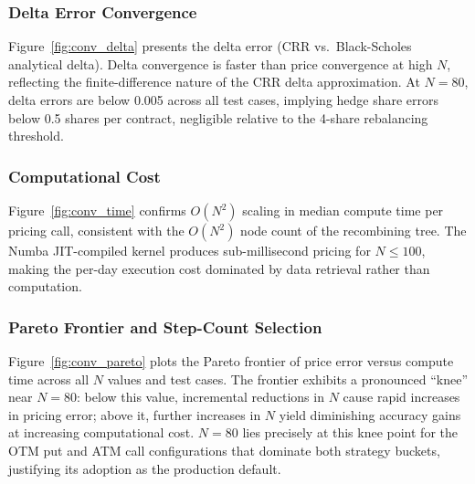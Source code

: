 \documentclass[10pt,twocolumn]{article}
\begin{document}
\subsubsection{Delta Error Convergence}

Figure~\ref{fig:conv_delta} presents the delta error (CRR vs.\ Black-Scholes
analytical delta). Delta convergence is faster than price convergence at high
$N$, reflecting the finite-difference nature of the CRR delta approximation.
At $N = 80$, delta errors are below 0.005 across all test cases, implying
hedge share errors below 0.5 shares per contract, negligible relative to
the 4-share rebalancing threshold.

\subsubsection{Computational Cost}

Figure~\ref{fig:conv_time} confirms $O(N^2)$ scaling in median compute time
per pricing call, consistent with the $O(N^2)$ node count of the recombining
tree. The Numba JIT-compiled kernel produces sub-millisecond pricing for
$N \leq 100$, making the per-day execution cost dominated by data retrieval
rather than computation.

\subsubsection{Pareto Frontier and Step-Count Selection}

Figure~\ref{fig:conv_pareto} plots the Pareto frontier of price error versus
compute time across all $N$ values and test cases. The frontier exhibits a
pronounced ``knee'' near $N = 80$: below this value, incremental reductions
in $N$ cause rapid increases in pricing error; above it, further increases in
$N$ yield diminishing accuracy gains at increasing computational cost.
$N = 80$ lies precisely at this knee point for the OTM put and ATM call
configurations that dominate both strategy buckets, justifying its adoption
as the production default.
\end{document}
